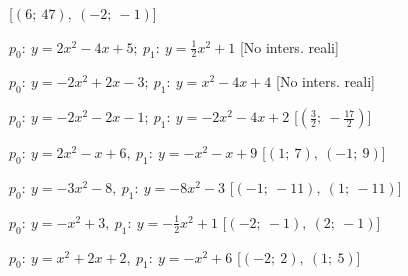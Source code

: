 \begin{esercizio}
\begin{enumeratea}
   \hfill [$\left (6;~47 \right ),~\left (-2;~-1 \right )$]
  \item  $p_0:~y=2 x^2 -4 x +5;~p_1:~y=\frac{1}{2} x^2 +1$
   \hfill [No inters. reali]
  \item  $p_0:~y=-2 x^2 +2 x -3;~p_1:~y=x^2 -4 x +4$
   \hfill [No inters. reali]
  \item  $p_0:~y=-2 x^2 -2 x -1;~p_1:~y=-2 x^2 -4 x +2$
   \hfill [$\left (\frac{3}{2};~-\frac{17}{2} \right )$]
% 
  \item  $p_0:~y=2 x^2 - x +6,~p_1:~y=- x^2 - x +9$
   \hfill [$\left (1;~7 \right ),~\left (-1;~9 \right )$]
  \item  $p_0:~y=-3 x^2 -8,~p_1:~y=-8 x^2 -3$
   \hfill [$\left (-1;~-11 \right ),~\left (1;~-11 \right )$]
  \item  $p_0:~y=- x^2 +3,~p_1:~y=-\frac{1}{2} x^2 +1$
   \hfill [$\left (-2;~-1 \right ),~\left (2;~-1 \right )$]
  \item  $p_0:~y=x^2 +2 x +2,~p_1:~y=- x^2 +6$
   \hfill [$\left (-2;~2 \right ),~\left (1;~5 \right )$]

\end{enumeratea}
\end{esercizio}
